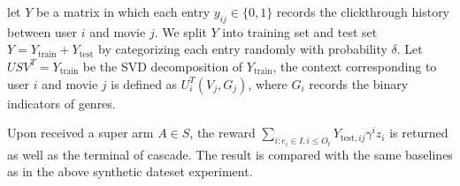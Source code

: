 \documentclass[a4paper,11pt]{article}
\begin{document}
let $Y$ be a matrix in which each entry $y_{ij}\in \{0,1\}$ records the clickthrough history between user $i$ and movie $j$. We split $Y$ into training set and test set $Y=Y_{\text{train}}+Y_{\text{test}}$ by categorizing each entry randomly with probability $\delta$. Let $USV^T=Y_{\text{train}}$ be the SVD decomposition of $Y_{\text{train}}$, the context corresponding to user $i$ and movie $j$ is defined as $U_i^T(V_j, G_j)$, where $G_i$ records the binary indicators of genres.

Upon received a super arm $A\in S$, the reward $\sum_{i:e_i\in I, i\leq O_t}{Y_{\text{test},ij}\gamma^i z_i}$ is returned as well as the terminal of cascade. The result is compared with the same baselines as in the above synthetic dateset experiment.
\end{document}
